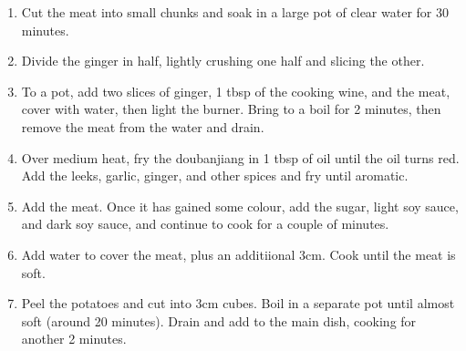 \begin{enumerate}
  \item Cut the meat into small chunks and soak in a large pot of clear water for 30 minutes.
  \item Divide the ginger in half, lightly crushing one half and slicing the other.
  \item To a pot, add two slices of ginger, 1 tbsp of the cooking wine, and the meat, cover with water, then light the burner. Bring to a boil for 2 minutes, then remove the meat from the water and drain.
  \item Over medium heat, fry the doubanjiang in 1 tbsp of oil until the oil turns red. Add the leeks, garlic, ginger, and other spices and fry until aromatic.
  \item Add the meat. Once it has gained some colour, add the sugar, light soy sauce, and dark soy sauce, and continue to cook for a couple of minutes.
  \item Add water to cover the meat, plus an additiional 3cm. Cook until the meat is soft.
  \item Peel the potatoes and cut into 3cm cubes. Boil in a separate pot until almost soft (around 20 minutes). Drain and add to the main dish, cooking for another 2 minutes.
\end{enumerate}

